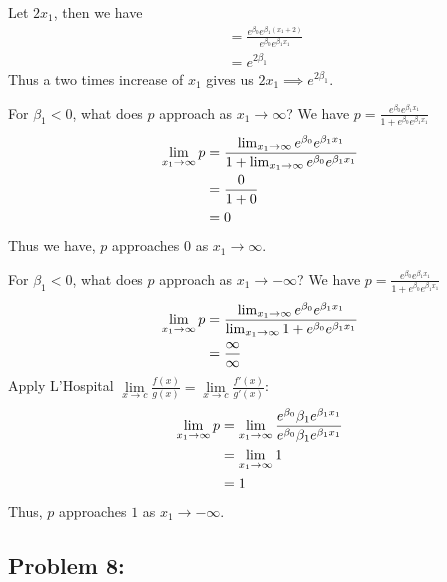 \documentclass[]{article}
\begin{document}
Let \(2x_1\), then we have \[
\begin{aligned}
    &=\frac{e^{\beta_0} e^{\beta_1 (x_1+2)}}{e^{\beta_0} e^{\beta_1 x_1}}\\
    &=e^{2 \beta_1}
\end{aligned}
\] Thus a two times increase of \(x_1\) gives us
\(2x_1 \implies e^{2 \beta_1}\).

For \(\beta_1 < 0\), what does \(p\) approach as
\(x_1 \rightarrow \infty\)? We have
\(p = \frac{e^{\beta_0} e^{\beta_1 x_1}}{1+e^{\beta_0} e^{\beta_1 x_1}}\)
\[
\begin{aligned}
    \lim_{x_1\to\infty} p &=\frac{\lim_{x_1\to\infty} e^{\beta_0} e^{\beta_1 x_1}}{1+\lim_{x_1\to\infty} e^{\beta_0} e^{\beta_1 x_1}}\\
    &= \frac{0}{1+0}\\
    &= 0\\
\end{aligned}\\
\] Thus we have, \(p\) approaches \(0\) as \(x_1 \rightarrow \infty\).

For \(\beta_1 < 0\), what does \(p\) approach as
\(x_1 \rightarrow -\infty\)? We have
\(p = \frac{e^{\beta_0} e^{\beta_1 x_1}}{1+e^{\beta_0} e^{\beta_1 x_1}}\)
\[
\begin{aligned}
    \lim_{x_1\to\infty} p &=\frac{\lim_{x_1\to\infty} e^{\beta_0} e^{\beta_1 x_1}}{\lim_{x_1\to\infty}1+e^{\beta_0} e^{\beta_1 x_1}}\\
    &= \frac{\infty}{\infty}\\
\end{aligned}\\
\] Apply L'Hospital
\(\mathop {\lim }\limits_{x \to c} \frac{{f\left( x \right)}}{{g\left( x \right)}} = \mathop {\lim }\limits_{x \to c} \frac{{f'\left( x \right)}}{{g'\left( x \right)}}\):
\[
\begin{aligned}
    \lim_{x_1\to\infty} p &= \lim_{x_1\to\infty}\frac{e^{\beta_0} \beta_1 e^{\beta_1 x_1}}{e^{\beta_0} \beta_1 e^{\beta_1 x_1}}\\
    &= \lim_{x_1\to\infty} 1\\
    &= 1\\
\end{aligned}\\
\] Thus, \(p\) approaches \(1\) as \(x_1 \rightarrow -\infty\).

\hypertarget{problem-8}{%
\subsection{Problem 8:}\label{problem-8}}
\end{document}
